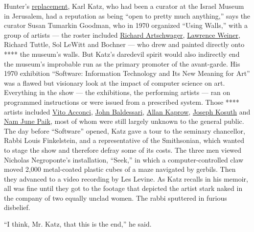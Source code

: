 Hunter's
\href{https://www.nytimes3xbfgragh.onion/1968/04/03/archives/jewish-museum-finds-its-new-director-brooklynborn-karl-katz-in.html}{replacement},
Karl Katz, who had been a curator at the Israel Museum in Jerusalem, had
a reputation as being ``open to pretty much anything,'' says the curator
Susan Tumarkin Goodman, who in 1970 organized ``Using Walls,'' with a
group of artists --- the roster included
\href{https://www.nytimes3xbfgragh.onion/2013/02/11/arts/design/richard-artschwager-painter-and-sculptor-dies-at-89.html}{Richard
Artschwager},
\href{https://www.lissongallery.com/artists/lawrence-weiner}{Lawrence
Weiner}, Richard Tuttle, Sol LeWitt and Bochner --- who drew and painted
directly onto **** the museum's walls. But Katz's daredevil spirit would
also indirectly end the museum's improbable run as the primary promoter
of the avant-garde. His 1970 exhibition ``Software: Information
Technology and Its New Meaning for Art'' was a flawed but visionary look
at the impact of computer science on art. Everything in the show --- the
exhibitions, the performing artists --- ran on programmed instructions
or were issued from a prescribed system. Those **** artists included
\href{https://www.nytimes3xbfgragh.onion/2017/04/28/arts/design/vito-acconci-dead-performance-artist.html}{Vito
Acconci},
\href{https://www.nytimes3xbfgragh.onion/2020/01/05/arts/john-baldessari-dead.html}{John
Baldessari},
\href{https://www.nytimes3xbfgragh.onion/2006/04/10/arts/design/allan-kaprow-creator-of-artistic-happenings-dies-at-78.html}{Allan
Kaprow}, \href{https://www.skny.com/artists/joseph-kosuth}{Joseph
Kosuth} and
\href{https://www.nytimes3xbfgragh.onion/2006/01/31/arts/design/nam-june-paik-73-dies-pioneer-of-video-art-whose-work-broke.html}{Nam
June Paik}, most of whom were still largely unknown to the general
public. The day before ``Software'' opened, Katz gave a tour to the
seminary chancellor, Rabbi Louis Finkelstein, and a representative of
the Smithsonian, which wanted to stage the show and therefore defray
some of its costs. The three men viewed Nicholas Negroponte's
installation, ``Seek,'' in which a computer-controlled claw moved 2,000
metal-coated plastic cubes of a maze navigated by gerbils. Then they
advanced to a video recording by Les Levine. As Katz recalls in his
memoir, all was fine until they got to the footage that depicted the
artist stark naked in the company of two equally unclad women. The rabbi
sputtered in furious disbelief.

``I think, Mr. Katz, that this is the end,'' he said.

